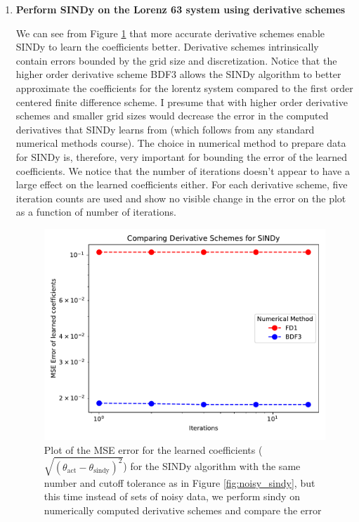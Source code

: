 \documentclass{article}
\begin{document}
\begin{enumerate}
    \item \textbf{\Large Perform SINDy on the Lorenz 63 system using derivative
    schemes}

    We can see from Figure \ref{fig:numerical_sindy} that more accurate
    derivative schemes enable SINDy to learn the coefficients better. Derivative
    schemes intrinsically contain errors bounded by the grid size and
    discretization. Notice that the higher order derivative scheme BDF3 allows
    the SINDy algorithm to better approximate the coefficients for the lorentz
    system compared to the first order centered finite difference scheme. I
    presume that with higher order derivative schemes and smaller grid sizes
    would decrease the error in the computed derivatives that SINDy learns from
    (which follows from any standard numerical methods course). 
    The choice in numerical method to prepare data for SINDy is, therefore, very
    important for bounding the error of the learned coefficients. We notice that
    the number of iterations doesn't appear to have a large effect on the
    learned coefficients either. For each derivative scheme, five iteration
    counts are used and show no visible change in the error on the plot as a
    function of number of iterations. 
    \begin{figure}[ht]
        \centering
        \includegraphics[width=.8\textwidth]{numerical_coeff_err.pdf}
        \caption{Plot of the MSE error for the learned coefficients
        ($\sqrt{(\theta_{\text{act}} - \theta_{\text{sindy}})^2}$) for the SINDy
        algorithm with the same number and cutoff tolerance as in Figure
        \ref{fig:noisy_sindy}, but this time instead of sets of noisy data, we
        perform sindy on numerically computed derivative schemes and compare the
        error}
        \label{fig:numerical_sindy}
    \end{figure}    
   
    \end{enumerate}
\end{document}
